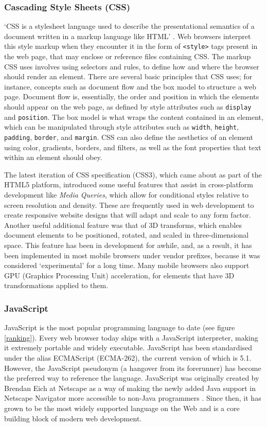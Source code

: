 \documentclass[final]{cmpreport}
\begin{document}
\subsubsection{Cascading Style Sheets (CSS)}
`CSS is a stylesheet language used to describe the presentational semantics of a document written in a markup language like HTML' \citep{Neilson}. Web browsers interpret this style markup when they encounter it in the form of \texttt{<style>} tags present in the web page, that may enclose or reference files containing CSS. The markup CSS uses involves using selectors and rules, to define how and where the browser should render an element. There are several basic principles that CSS uses; for instance, concepts such as document flow and the box model to structure a web page. Document flow is, essentially, the order and position in which the elements should appear on the web page, as defined by style attributes such as \texttt{display} and \texttt{position}. The box model is what wraps the content contained in an element, which can be manipulated through style attributes such as \texttt{width}, \texttt{height}, \texttt{padding}, \texttt{border}, and \texttt{margin}. CSS can also define the aesthetics of an element using color, gradients, borders, and filters, as well as the font properties that text within an element should obey.

The latest iteration of CSS specification (CSS3), which came about as part of the HTML5 platform, introduced some useful features that assist in cross-platform development like \textit{Media Queries}, which allow for conditional styles relative to screen resolution and density. These are  frequently used in web development to create responsive website designs that will adapt and scale to any form factor. Another useful additional feature was that of 3D transforms,  which enables document elements to be positioned, rotated, and scaled in three-dimensional space. This feature has been in development for awhile, and, as a result, it has been implemented in most mobile browsers under vendor prefixes, because it was considered `experimental' for a long time. Many mobile browsers also support GPU (Graphics Processing Unit) acceleration, for elements that have 3D transformations applied to them.

\subsubsection{JavaScript}
JavaScript is the most popular programming language to date (see figure \ref{ranking}). Every web browser today ships with a JavaScript interpreter, making it extremely portable and widely executable. JavaScript has been standardised under the alias ECMAScript (ECMA-262), the current version of which is 5.1\footnotemark. However, the JavaScript pseudonym (a hangover from its forerunner) has become the preferred way to reference the language. JavaScript was originally created by Brendan Eich at Netscape as a way of making the newly added Java support in Netscape Navigator more accessible to non-Java programmers \citep{Champeon}. Since then, it has grown to be the most widely supported  language on the Web and is a core building block of modern web development.
\end{document}
